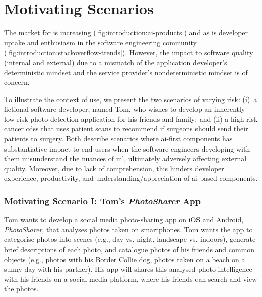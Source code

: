 \section{Motivating Scenarios}
\label{ssec:introduction:motivation}


The market for  is increasing (\cref{fig:introduction:ai-products}) and as is developer uptake and enthusiasm in the software engineering community (\cref{fig:introduction:stackoverflow-trends}). However, the impact to software quality (internal and external) due to a mismatch of the application developer's deterministic  mindset and the service provider's nondeterministic mindset is of concern.

To illustrate the context of use, we present the two scenarios of varying risk: (i)~a fictional software developer, named Tom, who wishes to develop an inherently low-risk photo detection application for his friends and family; and (ii) a high-risk cancer \gls{cdss} that uses patient scans to recommend if surgeons should send their patients to surgery. Both describe scenarios where \gls{ai}-first components has substantiative impact to end-users when the software engineers developing with them misunderstand the nuances of \gls{ml}, ultimately adversely affecting external quality. Moreover, due to lack of comprehension, this hinders developer experience, productivity, and understanding/appreciation of \gls{ai}-based components.
  
\subsubsection{Motivating Scenario I: Tom's \textit{PhotoSharer} App}
\label{ssec:introduction:motivation:scenario:pam}

Tom wants to develop a social media photo-sharing app on iOS and Android, \textit{PhotoSharer}, that analyses photos taken on smartphones. Tom wants the app to categorise photos into scenes (e.g., day vs. night, landscape vs. indoors), generate brief descriptions of each photo, and catalogue photos of his friends and common objects (e.g., photos with his Border Collie dog, photos taken on a beach on a sunny day with his partner). His app will shares this analysed photo intelligence with his friends on a social-media platform, where his friends can search and view the photos.

